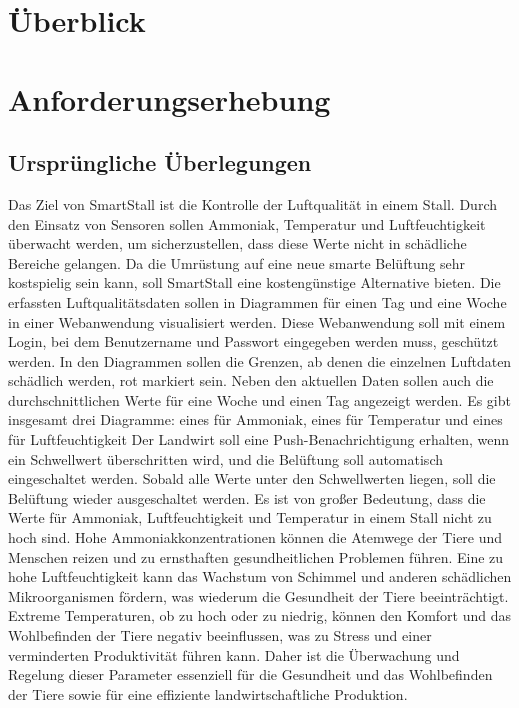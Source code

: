 \documentclass[conference]{IEEEtran}
\begin{document}
\section{Überblick}

\section{Anforderungserhebung}
\subsection{Ursprüngliche Überlegungen}
Das Ziel von SmartStall ist die Kontrolle der Luftqualität in einem Stall. Durch den Einsatz von Sensoren sollen Ammoniak, Temperatur und Luftfeuchtigkeit überwacht werden, um sicherzustellen, dass diese Werte nicht in schädliche Bereiche gelangen. Da die Umrüstung auf eine neue smarte Belüftung sehr kostspielig sein kann, soll SmartStall eine kostengünstige Alternative bieten.
Die erfassten Luftqualitätsdaten sollen in Diagrammen für einen Tag und eine Woche in einer Webanwendung visualisiert werden. Diese Webanwendung soll mit einem Login, bei dem Benutzername und Passwort eingegeben werden muss, geschützt werden. In den Diagrammen sollen die Grenzen, ab denen die einzelnen Luftdaten schädlich werden, rot markiert sein. Neben den aktuellen Daten sollen auch die durchschnittlichen Werte für eine Woche und einen Tag angezeigt werden. Es gibt insgesamt drei Diagramme: eines für Ammoniak, eines für Temperatur und eines für Luftfeuchtigkeit
Der Landwirt soll eine Push-Benachrichtigung erhalten, wenn ein Schwellwert überschritten wird, und die Belüftung soll automatisch eingeschaltet werden. Sobald alle Werte unter den Schwellwerten liegen, soll die Belüftung wieder ausgeschaltet werden.
Es ist von großer Bedeutung, dass die Werte für Ammoniak, Luftfeuchtigkeit und Temperatur in einem Stall nicht zu hoch sind. Hohe Ammoniakkonzentrationen können die Atemwege der Tiere und Menschen reizen und zu ernsthaften gesundheitlichen Problemen führen. Eine zu hohe Luftfeuchtigkeit kann das Wachstum von Schimmel und anderen schädlichen Mikroorganismen fördern, was wiederum die Gesundheit der Tiere beeinträchtigt. Extreme Temperaturen, ob zu hoch oder zu niedrig, können den Komfort und das Wohlbefinden der Tiere negativ beeinflussen, was zu Stress und einer verminderten Produktivität führen kann. Daher ist die Überwachung und Regelung dieser Parameter essenziell für die Gesundheit und das Wohlbefinden der Tiere sowie für eine effiziente landwirtschaftliche Produktion. 
\end{document}
